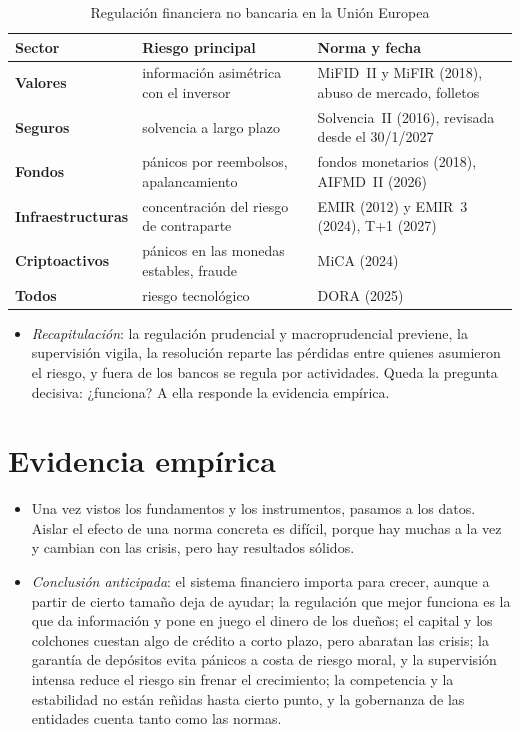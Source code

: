 \documentclass[11pt]{article}
\begin{document}
\begin{table}[H]
\centering
\caption{Regulación financiera no bancaria en la Unión Europea}\label{tab:no-bancaria}
\small
\begin{tabular}{>{\raggedright\arraybackslash}m{2.6cm}|>{\raggedright\arraybackslash}m{4.4cm}|>{\raggedright\arraybackslash}m{6.6cm}}
\rowcolor{tceeazulpalido}\textbf{Sector} & \textbf{Riesgo principal} & \textbf{Norma y fecha}\\ \hline
\textbf{Valores} & información asimétrica con el inversor & MiFID~II y MiFIR (2018), abuso de mercado, folletos\\ \hline
\textbf{Seguros} & solvencia a largo plazo & Solvencia~II (2016), revisada desde el 30/1/2027\\ \hline
\textbf{Fondos} & pánicos por reembolsos, apalancamiento & fondos monetarios (2018), AIFMD~II (2026)\\ \hline
\textbf{Infraestructuras} & concentración del riesgo de contraparte & EMIR (2012) y EMIR~3 (2024), T+1 (2027)\\ \hline
\textbf{Criptoactivos} & pánicos en las monedas estables, fraude & MiCA (2024)\\ \hline
\textbf{Todos} & riesgo tecnológico & DORA (2025)\\
\end{tabular}
\end{table}

\begin{itemize}
\item \emph{Recapitulación}: la regulación prudencial y macroprudencial previene, la supervisión vigila, la resolución reparte las pérdidas entre quienes asumieron el riesgo, y fuera de los bancos se regula por actividades. Queda la pregunta decisiva: ¿funciona? A ella responde la evidencia empírica.
\end{itemize}

\section{Evidencia empírica}\label{sec:evidencia}

\begin{itemize}
\item Una vez vistos los fundamentos y los instrumentos, pasamos a los datos. Aislar el efecto de una norma concreta es difícil, porque hay muchas a la vez y cambian con las crisis, pero hay resultados sólidos.
\item \emph{Conclusión anticipada}: el sistema financiero importa para crecer, aunque a partir de cierto tamaño deja de ayudar; la regulación que mejor funciona es la que da información y pone en juego el dinero de los dueños; el capital y los colchones cuestan algo de crédito a corto plazo, pero abaratan las crisis; la garantía de depósitos evita pánicos a costa de riesgo moral, y la supervisión intensa reduce el riesgo sin frenar el crecimiento; la competencia y la estabilidad no están reñidas hasta cierto punto, y la gobernanza de las entidades cuenta tanto como las normas.
\end{itemize}
\end{document}
